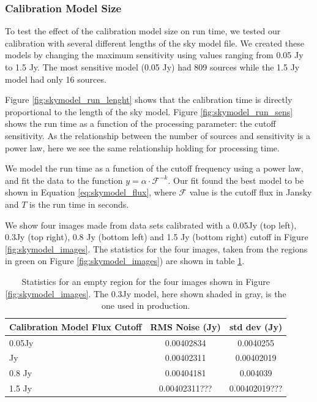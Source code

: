 \documentclass[preprint,5p]{elsarticle}
\begin{document}
\subsubsection{Calibration Model Size}
To test the effect of the calibration model size on run time, we tested our calibration with several different lengths of the sky model file. We created these models by changing the maximum sensitivity using values ranging from 0.05 Jy to 1.5 Jy. The most sensitive model (0.05 Jy) had 809 sources while the 1.5 Jy model had only 16 sources. 

Figure \ref{fig:skymodel_run_lenght} shows that the calibration time is directly proportional to the length of the sky model. Figure \ref{fig:skymodel_run_sens} shows the run time as a function of the processing parameter: the cutoff sensitivity. As the relationship between the number of sources and sensitivity is a power law, here we see the same relationship holding for processing time.

We model the run time as a function of the cutoff frequency using a power law, and fit the data to the function $y=\alpha\cdot \mathcal{F}^{-k}$. Our fit found the best model to be shown in Equation \ref{eq:skymodel_flux}, where $\mathcal{F}$ value is the cutoff flux in Jansky and $T$ is the run time in seconds. 

We show four images made from data sets calibrated with a 0.05Jy (top left), 0.3Jy (top right), 0.8 Jy (bottom left) and 1.5 Jy (bottom right) cutoff in Figure \ref{fig:skymodel_images}. The statistics for the four images, taken from the regions in green on Figure \ref{fig:skymodel_images}) are shown in table \ref{table:skymodel_RMS}.


\begin{table}[h!]
\centering
\begin{tabular}{||p{2.6cm}| c | c||} 
 \hline
 Calibration Model Flux Cutoff & RMS Noise (Jy) & std dev (Jy) \\ [0.5ex]
 \hline
 0.05Jy & 0.00402834   & 0.0040255    \\ 
  \rowcolor{Gray}
  \hline
 0.3 Jy & 0.00402311 & 0.00402019 \\
 \hline
 0.8 Jy & 0.00404181 & 0.004039 \\  
 1.5 Jy & 0.00402311??? & 0.00402019???\\
 \hline
\end{tabular}
\caption{Statistics for an empty region for the four images shown in Figure \ref{fig:skymodel_images}. The 0.3Jy model, here shown shaded in gray,  is the one used in production.  }
\label{table:skymodel_RMS}
\end{table}
\end{document}
